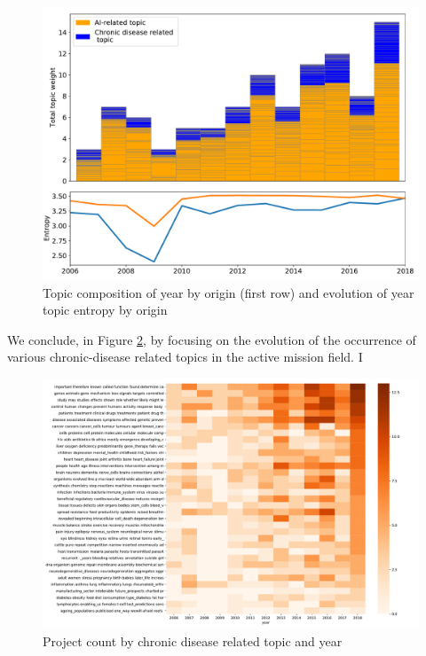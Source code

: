 \documentclass[11pt]{article}
\begin{document}
\begin{figure}[!ht]
    \centering
    \includegraphics[width=\textwidth]{figures/fig_20_topic_trends.pdf}
    \caption{Topic composition of year by origin (first row) and evolution of year topic entropy by origin}
    \label{fig:topic_evol}
\end{figure}

We conclude, in Figure \ref{fig:cd_importance}, by focusing on the evolution of the occurrence of various chronic-disease related topics in the active mission field. I

\begin{figure}[!ht]
    \centering
    \includegraphics[width=\textwidth]{figures/fig_21_heatmap.pdf}
    \caption{Project count by chronic disease related topic and year}
    \label{fig:cd_importance}
\end{figure}
\end{document}
